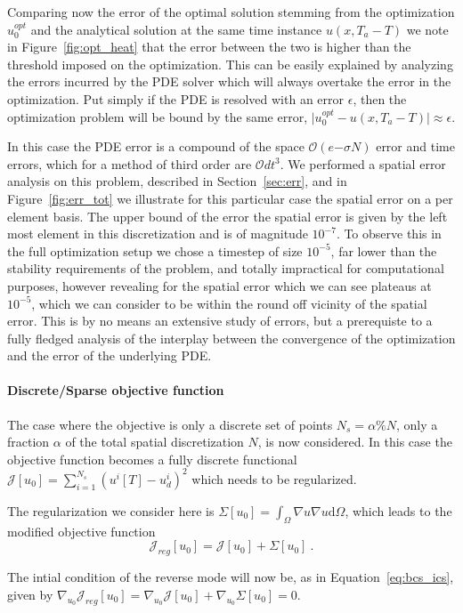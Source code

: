 \documentclass[10pt]{article}
\renewcommand{\d}{\mathrm{d}}
\begin{document}
Comparing now the error of the optimal solution stemming from the optimization $u_0^{opt}$ and the analytical solution at the same time instance $u(x,T_a-T)$ we note in Figure~\ref{fig:opt_heat} that the error between the two is higher than the threshold imposed on the optimization. This can be easily explained by analyzing the errors incurred by the PDE solver which will always overtake the error in the optimization. Put simply if the PDE is resolved with an error $\epsilon$, then the optimization problem will be bound by the same error, $\vert u_0^{opt} -u(x,T_a-T)\vert \approx \epsilon $. 

In this case the PDE error is a compound of the space $\mathcal O(e{-\sigma N})$ error and time errors, which for a method of third order are $\mathcal O{dt^3}$. We performed a spatial error analysis on this problem, described in Section~\ref{sec:err}, and in Figure~\ref{fig:err_tot} we illustrate for this particular case the spatial error on a per element basis. The upper bound of the error the spatial error is given by the left most element in this discretization and is of magnitude $10^{-7}$. To observe this in the full optimization setup we chose a timestep of size $10^{-5}$, far lower than the stability requirements of the problem, and totally impractical for computational purposes, however revealing for the spatial error which we can see plateaus at $10^{-5}$, which we can consider to be within the round off vicinity of the spatial error. This is by no means an extensive study of errors, but a prerequiste to a fully fledged analysis of the interplay between the convergence of the optimization and the error of the underlying PDE.

\paragraph{Discrete/Sparse objective function}
The case where the objective is only a discrete set of points $N_s=\alpha\%N$, only a fraction $\alpha$ of the total spatial discretization $N$, is now considered. In this case the objective function becomes a fully discrete functional
$\mathcal J[u_0]=\sum_{i=1}^{N_s} (u^i[T]-u^i_d)^2 $ which needs to be regularized.

The regularization we consider here is 
$\Sigma[u_0]=\int_{\Omega} \nabla u \nabla u \d\Omega$, which leads to the modified objective function
$$\mathcal J_{reg}[u_0]= \mathcal J[u_0]+\Sigma[u_0] \ .$$

The intial condition of the reverse mode will now be, as in Equation~\ref{eq:bcs_ics}, given by $\nabla_{u_0} \mathcal J_{reg}[u_0] =\nabla_{u_0} \mathcal J[u_0]+\nabla_{u_0} \Sigma[u_0]=0 $.
\end{document}
